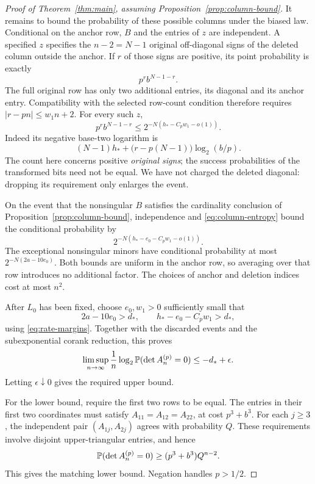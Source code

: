 \begin{proof}[Proof of Theorem~\ref{thm:main}, assuming
Proposition~\ref{prop:column-bound}]
It remains to bound the probability of these possible columns
under the biased law. Conditional on the anchor row, \(B\)
and the entries of \(z\) are independent. A specified \(z\)
specifies the \(n-2=N-1\) original off-diagonal signs of the
deleted column outside the anchor. If \(r\) of those signs
are positive, its point probability is exactly
\[
 p^r b^{N-1-r}.
\]
The full original row has only two additional entries, its
diagonal and its anchor entry. Compatibility with the selected
row-count condition therefore requires
\(|r-pn|\le w_1n+2\).
For every such \(z\),
\begin{equation}\label{eq:column-entropy}
 p^r b^{N-1-r}
 \le 2^{-N(h_*-C_pw_1-o(1))}.
\end{equation}
Indeed its negative base-two logarithm is
\[
 (N-1)h_*+
 \bigl(r-p(N-1)\bigr)\log_2(b/p).
\]
The count here concerns positive \emph{original signs};
the success probabilities of the transformed bits need not
be equal. We have not charged the deleted diagonal: dropping
its requirement only enlarges the event.

On the event that the nonsingular \(B\) satisfies the cardinality
conclusion of Proposition~\ref{prop:column-bound}, independence
and \eqref{eq:column-entropy} bound the conditional probability
by
\[
 2^{-N(h_*-e_0-C_pw_1-o(1))}.
\]
The exceptional nonsingular minors have conditional probability
at most \(2^{-N(2a-10e_0)}\). Both bounds are uniform in the
anchor row, so averaging over that row introduces no additional
factor. The choices of anchor and deletion indices cost at
most \(n^2\).

After \(L_0\) has been fixed, choose \(e_0,w_1>0\) sufficiently
small that
\[
 2a-10e_0>d_*,
 \qquad h_*-e_0-C_pw_1>d_*,
\]
using \eqref{eq:rate-margins}. Together with the discarded
events and the subexponential corank reduction, this proves
\[
 \limsup_{n\to\infty}\frac1n\log_2
       \mathbb P(\det A_n^{(p)}=0)\le-d_*+\epsilon.
\]
Letting \(\epsilon\downarrow0\) gives the required upper bound.

For the lower bound, require the first two rows to be equal.
The entries in their first two coordinates must satisfy
\(A_{11}=A_{12}=A_{22}\), at cost \(p^3+b^3\).
For each \(j\ge3\), the independent pair
\((A_{1j},A_{2j})\) agrees with probability \(Q\).
These requirements involve disjoint upper-triangular entries,
and hence
\[
 \mathbb P(\det A_n^{(p)}=0)\ge(p^3+b^3)Q^{n-2}.
\]
This gives the matching lower bound. Negation handles \(p>1/2\).
\end{proof}
